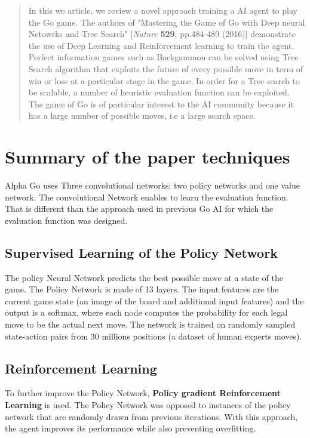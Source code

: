 \documentclass[12pt]{article}
\begin{document}
\maketitle

\begin{abstract}
In this we article, we review a novel approach training a AI agent to play the Go game. The authors of "Mastering the Game of Go with Deep neural Netowrks and Tree Search" [\textit{Nature} \textbf{529}, pp.484-489 (2016)] demonstrate the use of Deep Learning and Reinforcement learning to train the agent. Perfect information games such as  Backgammon can be solved using Tree Search algorithm that exploits the future of every possible move in term of win or loss at a particular stage in the game. In order for a Tree search to be scalable, a number of heuristic evaluation function can be exploited. The game of Go is of particular interest to the AI community because it has a large number of possible moves, i.e a large search space. 
\end{abstract}

\section{Summary of the paper techniques}
Alpha Go uses Three convolutional networks: two policy networks and one value network. The convolutional Network enables to learn the evaluation function. That is different than the approach used in previous Go AI for which the evaluation function was designed. 

\subsection{Supervised Learning of the Policy Network}
The policy Neural Network predicts the best possible move at a state of the game. The Policy Network is made of 13 layers. The input features are the current game state (an image of the board and additional input features) and the output is a softmax, where each node computes the probability for each legal move to be the actual next move. The network is trained on randomly sampled state-action pairs from 30 millions positions (a dataset of human experts moves).

\subsection{Reinforcement Learning}
To further improve the Policy Network, \textbf{Policy gradient Reinforcement Learning} is used. The Policy Network was opposed to instances of the policy network that are randomly drawn from previous iterations. With this approach, the agent improves its performance while also preventing overfitting.
\end{document}
